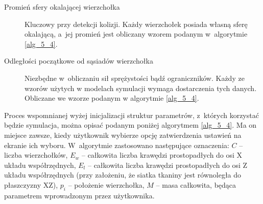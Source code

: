 \begin{description}
			\item[Promień sfery okalającej wierzchołka] Kluczowy przy detekcji kolizji. Każdy wierzchołek posiada własną sferę okalającą, a~jej promień jest obliczany wzorem podanym w~algorytmie \ref{alg_5_4}.
			
			\item[Odległości początkowe od sąsiadów wierzchołka] Niezbędne w~obliczaniu sił sprężystości bądź ograniczników. Każdy ze wzorów użytych w modelach symulacji wymaga dostarczenia tych danych. Obliczane we wzorze podanym w algorytmie \ref{alg_5_4}.
			
		\end{description}
		
		Proces wspomnianej wyżej inicjalizacji struktur parametrów, z~których korzystać będzie symulacja, można opisać podanym poniżej algorytmem \ref{alg_5_4}. Ma on miejsce zawsze, kiedy użytkownik wybierze opcję zatwierdzenia ustawień na ekranie ich wyboru. W~algorytmie zastosowano następujące oznaczenia: \(C\) -- liczba wierzchołków, \(E_{w}\) -- całkowita liczba krawędzi prostopadłych do osi X układu współrzędnych, \(E_{l}\) -- całkowita liczba krawędzi prostopadłych do osi Z układu współrzędnych (przy założeniu, że siatka tkaniny jest równoległa do płaszczyzny XZ), \(p_{i}\) -- położenie wierzchołka, \(M\) -- masa całkowita, będąca parametrem wprowadzonym przez użytkownika.
		
